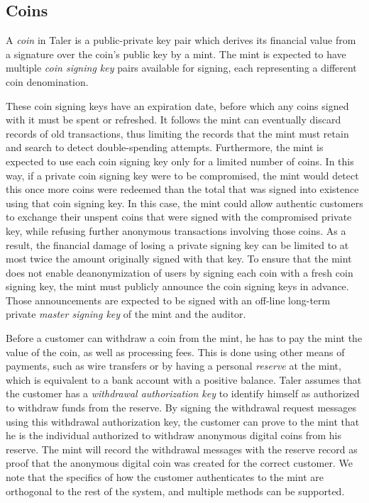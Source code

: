 \documentclass{llncs}
\begin{document}
\subsection{Coins}

A \emph{coin} in Taler is a public-private key pair which derives its
financial value from a signature over the coin's public key by a mint.
The mint is expected to have multiple {\em coin signing key} pairs
available for signing, each representing a different coin
denomination.

These coin signing keys have an expiration date, before which any coins
signed with it must be spent or refreshed.  It follows the mint can
eventually discard records of old transactions, thus limiting the
records that the mint must retain and search to detect double-spending
attempts.  Furthermore, the mint is expected to use each coin signing
key only for a limited number of coins.
In this way, if a private coin signing key were to be compromised,
the mint would detect this once more coins were redeemed than the total
that was signed into existence using that coin signing key.  
In this case, the mint could allow authentic customers to exchange their
unspent coins that were signed with the compromised private key, 
while refusing further anonymous transactions involving those coins. 
As a result, the financial damage of losing a private signing key can be
limited to at most twice the amount originally signed with that key.
To ensure that the mint does not enable deanonymization of users by
signing each coin with a fresh coin signing key, the mint must publicly
announce the coin signing keys in advance.  Those announcements are
expected to be signed with an off-line long-term private {\em master
signing key} of the mint and the auditor.

Before a customer can withdraw a coin from the mint, 
he has to pay the mint the value of the coin, as well as processing fees. 
This is done using other means of payments, such as wire transfers or
by having a personal {\em reserve} at the mint,
 which is equivalent to a bank account with a positive balance.  
Taler assumes that the customer has a {\em withdrawal authorization key}
to identify himself as authorized to withdraw funds from the reserve. 
By signing the withdrawal request messages using this withdrawal 
authorization key, the customer can prove to the mint that he is the 
individual authorized to withdraw anonymous digital coins from his reserve.
The mint will record the withdrawal messages with the reserve record as
proof that the anonymous digital coin was created for the correct
customer.  We note that the specifics of how the customer authenticates 
to the mint are orthogonal to the rest of the system, and
 multiple methods can be supported.
\end{document}
